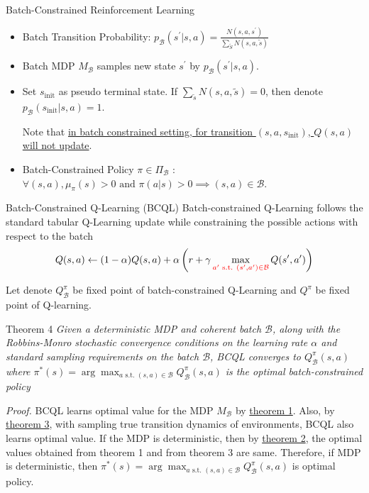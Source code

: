 \documentclass[11pt]{beamer}
\newcommand{\mc}[1]{\mathcal{#1}}
\newcommand{\ti}[1]{\textit{#1}}
\begin{document}
\begin{frame}{Batch-Constrained Reinforcement Learning}
    \begin{itemize}
        \item Batch Transition Probability: $p_{\mc{B}}(s^\prime|s,a) = \frac{N(s,a,s^\prime)}{\sum_{\tilde{S}}N(s,a,\tilde{s})}$
        \item Batch MDP $M_{\mc{B}}$ samples new state $s^\prime$ by $p_{\mc{B}}(s^\prime|s,a)$.
        
        
        \item Set $s_{\text{init}}$ as pseudo terminal state. If $\sum_{\tilde{s}} N(s,a, \tilde{s}) = 0$, then denote $p_{\mc{B}}(s_{\text{{init}}}|s,a) = 1$.
        
        Note that \underline{in batch constrained setting, for transition $(s,a,s_{\text{init}})$, $Q(s,a)$ will not update}.
        \item Batch-Constrained Policy $\pi \in \Pi_{\mc{B}}$ : $\forall (s,a), \mu_\pi(s)>0 \text{ and } \pi(a|s) > 0 \implies (s,a) \in \mc{B}$.
    \end{itemize}

    \begin{block}{Batch-Constrained Q-Learning (BCQL)}
        Batch-constrained Q-Learning follows the standard tabular Q-Learning update while constraining the possible actions with respect to the batch
        \[
            Q(s,a) \leftarrow (1-\alpha) Q(s,a) + \alpha \left(r + \gamma \max_{ \textcolor{red}{a^\prime \text{ s.t. }(s^\prime, a^\prime) \in \mc{B}}} Q(s^\prime, a^\prime) \right)
        \]
    \end{block}

    \vspace{0.5cm}
    Let denote $Q^\pi_{\mc{B}}$ be fixed point of batch-constrained Q-Learning and $Q^\pi$ be fixed point of Q-learning.
    \begin{block}{Theorem 4}
        \ti{Given a deterministic MDP and coherent batch $\mc{B}$, along with the Robbins-Monro stochastic convergence conditions on the learning rate $\alpha$ and standard sampling requirements on the batch $\mc{B}$, \ti{BCQL converges to $Q^{\pi}_\mc{B} (s,a)$ where $\pi^\ast(s) = \arg\max_{a \text{ s.t. }(s,a) \in \mc{B}} Q^\pi_{\mc{B}}(s,a)$ is the optimal batch-constrained policy}}

        \bigskip
        \ti{Proof.} BCQL learns optimal value for the MDP $M_{\mc{B}}$ by \hyperref[th:1]{theorem 1}.
        Also, by \hyperref[th:3]{theorem 3}, with sampling true transition dynamics of environments, BCQL also learns optimal value.
        If the MDP is deterministic, then by \hyperref[th:2]{theorem 2}, the optimal values obtained from theorem 1 and from theorem 3 are same.
        Therefore, if MDP is deterministic, then $\pi^\ast (s) = \arg \max_{a \text{ s.t. } (s,a) \in \mc{B}} Q^\pi_{\mc{B}}(s,a)$ is optimal policy.

    \end{block}

\end{frame}
\end{document}
